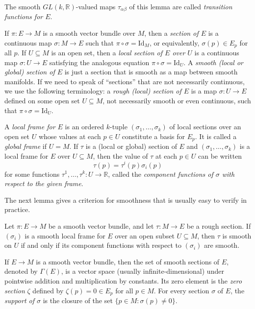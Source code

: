 The smooth $GL(k, \mathbb{R})$-valued maps $\tau_{\alpha\beta}$ of this lemma are called \textit{transition functions for $E$}.

If $\pi: E \to M$ is a smooth vector bundle over $M$, then a \textit{section of $E$} is a continuous map $\sigma: M \to E$ such that $\pi \circ \sigma = \text{Id}_M$, or equivalently, $\sigma(p) \in E_p$ for all $p$. If $U \subseteq M$ is an open set, then a \textit{local section of $E$ over $U$} is a continuous map $\sigma: U \to E$ satisfying the analogous equation $\pi \circ \sigma = \text{Id}_U$. A \textit{smooth (local or global) section of $E$} is just a section that is smooth as a map between smooth manifolds. If we need to speak of ``sections'' that are not necessarily continuous, we use the following terminology: a \textit{rough (local) section of $E$} is a map $\sigma: U \to E$ defined on some open set $U \subseteq M$, not necessarily smooth or even continuous, such that $\pi \circ \sigma = \text{Id}_U$.

A \textit{local frame for $E$} is an ordered $k$-tuple $(\sigma_1, \ldots, \sigma_k)$ of local sections over an open set $U$ whose values at each $p \in U$ constitute a basis for $E_p$. It is called a \textit{global frame} if $U = M$. If $\tau$ is a (local or global) section of $E$ and $(\sigma_1, \ldots, \sigma_k)$ is a local frame for $E$ over $U \subseteq M$, then the value of $\tau$ at each $p \in U$ can be written
\begin{equation*}
\tau(p) = \tau^i(p)\sigma_i(p)
\end{equation*}
for some functions $\tau^1, \ldots, \tau^k: U \to \mathbb{R}$, called the \textit{component functions of $\sigma$ with respect to the given frame}.

The next lemma gives a criterion for smoothness that is usually easy to verify in practice.

\begin{lemma}
\label{lem:local-frame-criterion-for-smoothness}
Let $\pi: E \to M$ be a smooth vector bundle, and let $\tau: M \to E$ be a rough section. If $(\sigma_i)$ is a smooth local frame for $E$ over an open subset $U \subseteq M$, then $\tau$ is smooth on $U$ if and only if its component functions with respect to $(\sigma_i)$ are smooth.
\end{lemma}

If $E \to M$ is a smooth vector bundle, then the set of smooth sections of $E$, denoted by $\Gamma(E)$, is a vector space (usually infinite-dimensional) under pointwise addition and multiplication by constants. Its zero element is the \textit{zero section} $\zeta$ defined by $\zeta(p) = 0 \in E_p$ for all $p \in M$. For every section $\sigma$ of $E$, the \textit{support of $\sigma$} is the closure of the set $\{p \in M: \sigma(p) \neq 0\}$.

